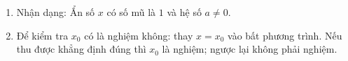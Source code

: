 \begin{enumerate}
\item Nhận dạng: Ẩn số $x$ có số mũ là $1$ và hệ số $a \ne 0$.
\item Để kiểm tra $x_0$ có là nghiệm không: thay $x = x_0$ vào bất phương trình. Nếu thu được khẳng định đúng thì $x_0$ là nghiệm; ngược lại không phải nghiệm.
\end{enumerate}
